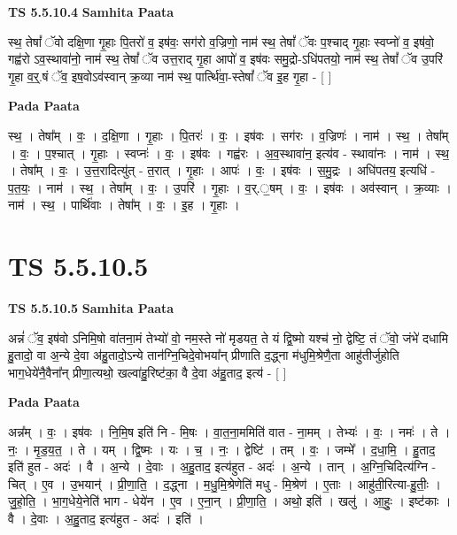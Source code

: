 \documentclass[17pt]{extarticle}
\begin{document}
\textbf{TS 5.5.10.4 } \newline
\textbf{Samhita Paata} \newline

स्थ॒ तेषां᳚ ॅवो दक्षि॒णा गृ॒हाः पि॒तरो॑ व॒ इष॑वः॒ सग॑रो व॒ज्रिणो॒ नाम॑ स्थ॒ तेषां᳚ ॅवः प॒श्चाद् गृ॒हाः स्वप्नो॑ व॒ इष॑वो॒ गह्व॑रो ऽव॒स्थावा॑नो॒ नाम॑ स्थ॒ तेषां᳚ ॅव उत्त॒राद् गृ॒हा आपो॑ व॒ इष॑वः समु॒द्रो-ऽधि॑पतयो॒ नाम॑ स्थ॒ तेषां᳚ ॅव उ॒परि॑ गृ॒हा व॒र्॒.षं ॅव॒ इष॒वोऽव॑स्वान् क्र॒व्या नाम॑ स्थ॒ पार्त्थि॑वा॒-स्तेषां᳚ ॅव इ॒ह गृ॒हा - [  ] \newline

\textbf{Pada Paata} \newline

स्थ॒ । तेषा᳚म् । वः॒ । द॒क्षि॒णा । गृ॒हाः । पि॒तरः॑ । वः॒ । इष॑वः । सग॑रः । व॒ज्रिणः॑ । नाम॑ । स्थ॒ । तेषा᳚म् । वः॒ । प॒श्चात् । गृ॒हाः । स्वप्नः॑ । वः॒ । इष॑वः । गह्व॑रः । अ॒व॒स्थावा॑न॒ इत्य॑व - स्थावा॑नः । नाम॑ । स्थ॒ । तेषा᳚म् । वः॒ । उ॒त्त॒रादित्यु॑त् - त॒रात् । गृ॒हाः । आपः॑ । वः॒ । इष॑वः । स॒मु॒द्रः । अधि॑पतय॒ इत्यधि॑ - प॒त॒यः॒ । नाम॑ । स्थ॒ । तेषा᳚म् । वः॒ । उ॒परि॑ । गृ॒हाः । व॒र्.॒षम् । वः॒ । इष॑वः । अव॑स्वान् । क्र॒व्याः । नाम॑ । स्थ॒ । पार्थि॑वाः । तेषा᳚म् । वः॒ । इ॒ह । गृ॒हाः ।  \newline





\section{ TS 5.5.10.5 }

\textbf{TS 5.5.10.5 } \newline
\textbf{Samhita Paata} \newline

अन्नं॑ ॅव॒ इष॑वो ऽनिमि॒षो वा॑तना॒मं तेभ्यो॑ वो॒ नम॒स्ते नो॑ मृडयत॒ ते यं द्वि॒ष्मो यश्च॑ नो॒ द्वेष्टि॒ तं ॅवो॒ जंभे॑ दधामि हु॒तादो॒ वा अ॒न्ये दे॒वा अ॑हु॒तादो॒ऽन्ये तान॑ग्नि॒चिदे॒वोभया᳚न् प्रीणाति द॒द्ध्ना म॑धुमि॒श्रेणै॒ता आहु॑तीर्जुहोति भाग॒धेये॑नै॒वैना᳚न् प्रीणा॒त्यथो॒ खल्वा॑हु॒रिष्ट॑का॒ वै दे॒वा अ॑हु॒ताद॒ इत्य॑ - [  ] \newline

\textbf{Pada Paata} \newline

अन्न᳚म् । वः॒ । इष॑वः । नि॒मि॒ष इति॑ नि - मि॒षः । वा॒त॒ना॒ममिति॑ वात - ना॒मम् । तेभ्यः॑ । वः॒ । नमः॑ । ते । नः॒ । मृ॒ड॒य॒त॒ । ते । यम् । द्वि॒ष्मः । यः । च॒ । नः॒ । द्वेष्टि॑ । तम् । वः॒ । जम्भे᳚ । द॒धा॒मि॒ । हु॒ताद॒ इति॑ हुत - अदः॑ । वै । अ॒न्ये । दे॒वाः । अ॒हु॒ताद॒ इत्य॑हुत - अदः॑ । अ॒न्ये । तान् । अ॒ग्नि॒चिदित्य॑ग्नि - चित् । ए॒व । उ॒भयान्॑ । प्री॒णा॒ति॒ । द॒द्ध्ना । म॒धु॒मि॒श्रेणेति॑ मधु - मि॒श्रेण॑ । ए॒ताः । आहु॑ती॒रित्या-हु॒तीः॒ । जु॒हो॒ति॒ । भा॒ग॒धेये॒नेति॑ भाग - धेये॑न । ए॒व । ए॒ना॒न् । प्री॒णा॒ति॒ । अथो॒ इति॑ । खलु॑ । आ॒हुः॒ । इष्ट॑काः । वै । दे॒वाः । अ॒हु॒ताद॒ इत्य॑हुत - अदः॑ । इति॑ ।  \newline
\end{document}
